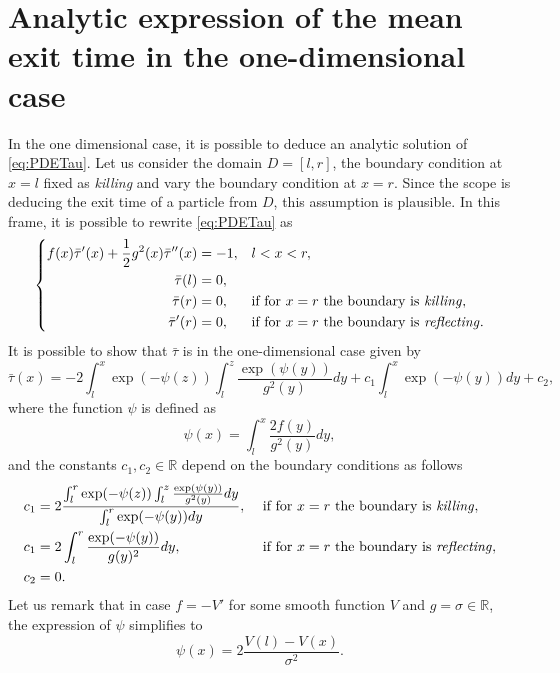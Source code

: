 \section{Analytic expression of the mean exit time in the one-dimensional case} \label{sec:Appendix1}
In the one dimensional case, it is possible to deduce an analytic solution of \eqref{eq:PDETau}. Let us consider the domain $D = [l, r]$, the boundary condition at $x=l$ fixed as \textit{killing} and vary the boundary condition at $x=r$. Since the scope is deducing the exit time of a particle from $D$, this assumption is plausible. In this frame, it is possible to rewrite \eqref{eq:PDETau} as
\begin{equation}\label{eq:ODETau}
\left \{
\begin{aligned}
	f(x)\bar\tau'(x) + \frac{1}{2} g^2(x) \bar\tau''(x) &= -1, && l < x < r, \\
	\bar\tau(l) &= 0, \\
	\bar\tau(r) &= 0, && \text{if for $x = r$ the boundary is \textit{killing}}, \\
	\bar\tau'(r) &= 0, && \text{if for $x = r$ the boundary is \textit{reflecting}}. 
\end{aligned} \right .
\end{equation}
It is possible to show \cite{Krumscheid2015,Pavliotis2014} that $\bar\tau$ is in the one-dimensional case given by
\begin{equation}\label{eq:AnalyticTau}
	\bar\tau(x) = -2 \int_l^x \exp(-\psi(z)) \int_l^z \frac{\exp(\psi(y))}{g^2(y)}dy + c_1 \int_l^x \exp(-\psi(y))dy + c_2,
\end{equation}
where the function $\psi$ is defined as
\begin{equation}\label{eq:psi}
	\psi(x) = \int_l^x \frac{2f(y)}{g^2(y)}dy,
\end{equation}
and the constants $c_1,c_2 \in \mathbb{R}$ depend on the boundary conditions as follows
\begin{equation}\label{eq:Constants}
\begin{aligned}
	c_1 &= 2\frac{\int_l^r \exp(-\psi(z)) \int_l^z \frac{\exp(\psi(y))}{g^2(y)}dy}{\int_l^r \exp(-\psi(y))dy}, && \text{  if for $x = r$ the boundary is \textit{killing}}, \\
	c_1 &= 2\int_l^r \frac{\exp(-\psi(y))}{g(y)^2}dy, && \text{  if for $x = r$ the boundary is \textit{reflecting}}, \\
	c_2 &= 0.
\end{aligned}
\end{equation}
Let us remark that in case $f = -V'$ for some smooth function $V$ and $g = \sigma \in \mathbb{R}$, the expression of $\psi$ simplifies to
\begin{equation}\label{eq:psiSemplified}
	\psi(x) = 2\frac{V(l)-V(x)}{\sigma^2}.
\end{equation}

